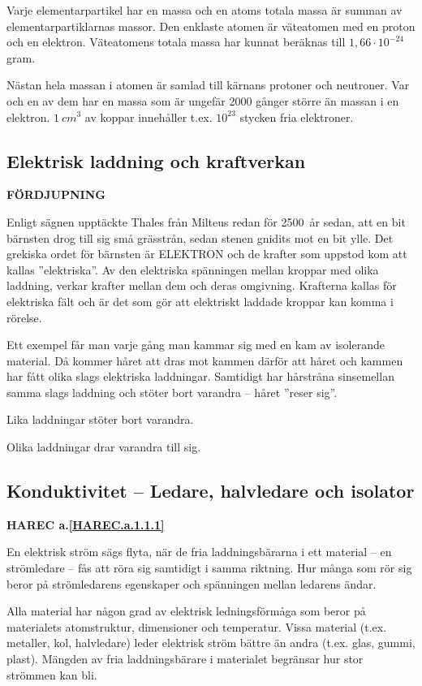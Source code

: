 Varje elementarpartikel har en massa och en atoms totala massa är summan av
elementarpartiklarnas massor.
Den enklaste atomen är väteatomen med en proton och en elektron.
Väteatomens totala massa har kunnat beräknas till \(1,66 \cdot 10^{-24}\) gram.

Nästan hela massan i atomen är samlad till kärnans protoner och neutroner.
Var och en av dem har en massa som är ungefär 2000 gånger större än massan i en
elektron.
\(1\ cm^3\) av koppar innehåller t.ex. \(10^{23}\) stycken fria elektroner.

\subsection{Elektrisk laddning och kraftverkan}
\textbf{FÖRDJUPNING}

Enligt sägnen upptäckte Thales från Milteus redan för 2500~år sedan, att en bit
bärnsten drog till sig små grässtrån, sedan stenen gnidits mot en bit ylle.
Det grekiska ordet för bärnsten är ELEKTRON och de krafter som uppstod kom att
kallas ''elektriska''.
Av den elektriska spänningen mellan kroppar med olika laddning, verkar krafter
mellan dem och deras omgivning.
Krafterna kallas för elektriska fält och är det som gör att elektriskt laddade
kroppar kan komma i rörelse.

Ett exempel får man varje gång man kammar sig med en kam av isolerande material.
Då kommer håret att dras mot kammen därför att håret och kammen har
fått olika slags elektriska laddningar.
Samtidigt har hårstråna sinsemellan samma slags laddning och stöter bort
varandra -- håret ''reser sig''.

Lika laddningar stöter bort varandra.

Olika laddningar drar varandra till sig.

\subsection{Konduktivitet -- Ledare, halvledare och isolator}
\textbf{HAREC a.\ref{HAREC.a.1.1.1}\label{myHAREC.a.1.1.1}}

En elektrisk ström sägs flyta, när de fria laddningsbärarna i ett material -- en
strömledare -- fås att röra sig samtidigt i samma riktning.
Hur många som rör sig beror på strömledarens egenskaper och spänningen mellan
ledarens ändar.

Alla material har någon grad av elektrisk ledningsförmåga som beror på
materialets atomstruktur, dimensioner och temperatur.
Vissa material (t.ex. metaller, kol, halvledare) leder elektrisk ström bättre
än andra (t.ex. glas, gummi, plast).
Mängden av fria laddningsbärare i materialet begränsar hur stor strömmen kan
bli.

